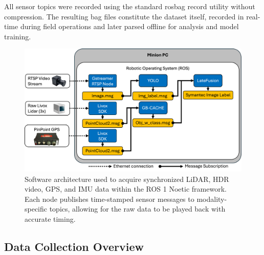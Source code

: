 \documentclass[../main.tex]{subfiles}
\begin{document}
All sensor topics were recorded using the standard rosbag record utility without compression. 
The resulting bag files constitute the dataset itself, recorded in real-time during field operations and later parsed offline for analysis and model training.




\begin{figure}[htbp]
    \centering
    \includegraphics[width=0.95\linewidth]{Images/ros.png}
    \caption{Software architecture used to acquire synchronized LiDAR, HDR video, GPS, and IMU data within the ROS 1 Noetic framework. Each node publishes time-stamped sensor messages to modality-specific topics, allowing for the raw data to be played back with accurate timing.}
    \label{fig:ros}
\end{figure}



\subsection{Data Collection Overview}
\label{sec:data_overview}
\end{document}
